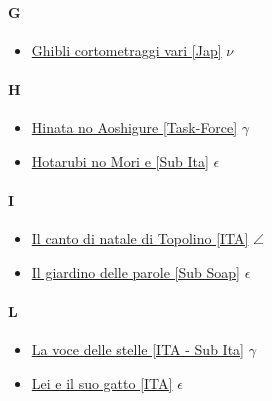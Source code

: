 		\paragraph{G} \hypertarget{CG}{}
			\begin{itemize}
				\item \href{https://mega.nz/#F!q58XUJRT!duuiIaWTznwZS17K4vVdjA} {Ghibli cortometraggi vari [Jap]} $\nu$ \\ 
			
			\end{itemize}	
			
		\paragraph{H} \hypertarget{CH}{}
			\begin{itemize}
				\item \href{https://mega.nz/#!I9xSzZgB!z3PnXAchGQGitTL6KSVTLMl45WjhwRRmZeISp4pHpJA} {Hinata no Aoshigure [Task-Force]} $\gamma$ \\ 
				\item \href{https://mega.nz/#!Eo5AjACZ!LzO669mD-99lHgzjiVtmW4Df3npoKJHyGvG5pLKCcpw} {Hotarubi no Mori e [Sub Ita]} $\epsilon$ \\ 
			\end{itemize}
			
		\paragraph{I} \hypertarget{CI}{}
			\begin{itemize}
				\item \href{https://mega.nz/#!YuxDEaoS!5NdI34RfNjT3pqQdj1vrV8MYxR_TE14Y-CxqQHcLSjg} {Il canto di natale di Topolino [ITA]} $\angle$ \\ 
				\item \href{https://mega.nz/#!48oh3SLD!jY3BOorlTlJ2u_hdvkb-W_GOmxlIg8V9QgGHKpr15ng} {Il giardino delle parole [Sub Soap]} $\epsilon$ \\ 
				
			\end{itemize}
		
		\paragraph{L} \hypertarget{CL}{}
			\begin{itemize}
				\item \href{https://mega.nz/#!dlhFCY6K!_0ABLi0R65ROG2fGENDwiTeI9kOAsPSemSMHk5vSP6I} {La voce delle stelle [ITA - Sub Ita]} $\gamma$ \\
				\item \href{https://mega.nz/#!dlhFCY6K!_0ABLi0R65ROG2fGENDwiTeI9kOAsPSemSMHk5vSP6I} {Lei e il suo gatto [ITA]} $\epsilon$ \\  
			
			\end{itemize}
			
